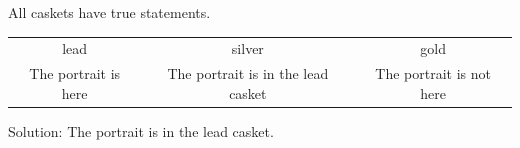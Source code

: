 All caskets have true statements.
\begin{tabular}{ccc}
\toprule
lead & silver & gold\\
The portrait is here & The portrait is in the lead casket & The portrait is not here\\
\bottomrule
\end{tabular}
Solution: The portrait is in the lead casket.